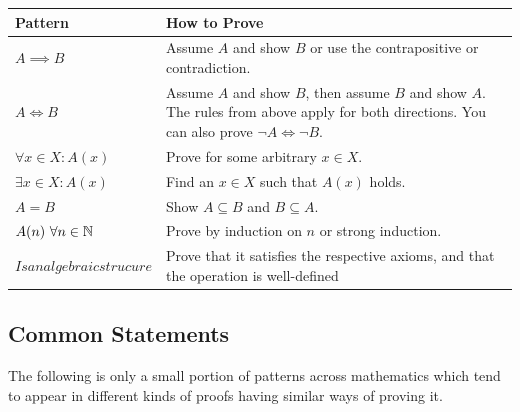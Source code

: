 \begin{center}
	\begin{tabular}{|l|l|}
		\hline
		\textbf{Pattern}             & \textbf{How to Prove}                                                                                                                                     \\
		\hline
		\(A \implies B\)             & Assume \(A\) and show \(B\) or use the contrapositive or contradiction.                                                                                   \\
		\hline
		\(A \iff B\)                 & Assume \(A\) and show \(B\), then assume \(B\) and show \(A\). The rules from above apply for both directions. You can also prove \(\neg A \iff \neg B\). \\
		\hline
		\(\forall x \in X: A(x)\)    & Prove for some arbitrary \(x \in X\).                                                                                                                     \\
		\hline
		\(\exists x \in X: A(x)\)    & Find an \(x \in X\) such that \(A(x)\) holds.                                                                                                             \\
		\hline
		\(A = B\)                    & Show \(A \subseteq B\) and \(B \subseteq A\).                                                                                                             \\
		\hline
		\(A(n)\ \forall n \in \mathbb{N}\)   & Prove by induction on \(n\) or strong induction.                                                                                                          \\
		\hline
		\(Is an algebraic strucure\) & Prove that it satisfies the respective axioms, and that the operation is well-defined                                                                     \\
	\end{tabular}
\end{center}

\subsection{Common Statements}

The following is only a small portion of patterns across mathematics which tend to appear in different kinds of proofs having similar
ways of proving it.

